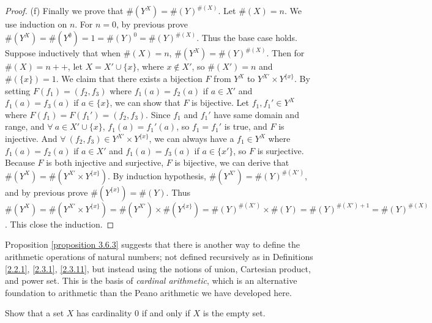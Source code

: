 \begin{proof}{(f)}
Finally we prove that \(\#(Y^X) = \#(Y)^{\#(X)}\).
Let \(\#(X) = n\).
We use induction on \(n\).
For \(n = 0\), by previous prove \(\#(Y^X) = \#(Y^{\emptyset}) = 1 = \#(Y)^0 = \#(Y)^{\#(X)}\).
Thus the base case holds.
Suppose inductively that when \(\#(X) = n\), \(\#(Y^X) = \#(Y)^{\#(X)}\).
Then for \(\#(X) = n++\), let \(X = X' \cup \{x\}\), where \(x \notin X'\), so \(\#(X') = n\) and \(\#(\{x\}) = 1\).
We claim that there exists a bijection \(F\) from \(Y^X\) to \(Y^{X'} \times Y^{\{x\}}\).
By setting \(F(f_1) = (f_2, f_3)\) where \(f_1(a) = f_2(a)\) if \(a \in X'\) and \(f_1(a) = f_3(a)\) if \(a \in \{x\}\), we can show that \(F\) is bijective.
Let \(f_1, f_1' \in Y^X\) where \(F(f_1) = F(f_1') = (f_2, f_3)\).
Since \(f_1\) and \(f_1'\) have same domain and range, and \(\forall\ a \in X' \cup \{x\}\), \(f_1(a) = f_1'(a)\), so \(f_1 = f_1'\) is true, and \(F\) is injective.
And \(\forall\ (f_2, f_3) \in Y^{X'} \times Y^{\{x\}}\), we can always have a \(f_1 \in Y^X\) where \(f_1(a) = f_2(a)\) if \(a \in X'\) and \(f_1(a) = f_3(a)\) if \(a \in \{x'\}\), so \(F\) is surjective.
Because \(F\) is both injective and surjective, \(F\) is bijective, we can derive that \(\#(Y^X) = \#(Y^{X'} \times Y^{\{x\}})\).
By induction hypothesis, \(\#(Y^{X'}) = \#(Y)^{\#(X')}\), and by previous prove \(\#(Y^{\{x\}}) = \#(Y)\).
Thus \(\#(Y^X) = \#(Y^{X'} \times Y^{\{x\}}) = \#(Y^{X'}) \times \#(Y^{\{x\}}) = \#(Y)^{\#(X')} \times \#(Y) = \#(Y)^{\#(X') + 1} = \#(Y)^{\#(X)}\).
This close the induction.
\end{proof}

\begin{remark}
Proposition \ref{proposition 3.6.3} suggests that there is another way to define the arithmetic operations of natural numbers;
not defined recursively as in Definitions \ref{2.2.1}, \ref{2.3.1}, \ref{2.3.11}, but instead using the notions of union, Cartesian product, and power set.
This is the basis of \emph{cardinal arithmetic}, which is an alternative foundation to arithmetic than the Peano arithmetic we have developed here.
\end{remark}

\begin{exercise}\label{exercise 3.6.1}
Show that a set \(X\) has cardinality \(0\) if and only if \(X\) is the empty set.
\end{exercise}

